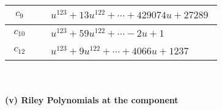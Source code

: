 \documentclass[1p]{elsarticle_modified}
\theoremstyle{definition}
\begin{document}
\begin{tabular}{m{50pt}|m{274pt}}
\hline $$\begin{aligned}c_{9}\end{aligned}$$&$\begin{aligned}
&u^{123}+13 u^{122}+\cdots+429074 u+27289
\end{aligned}$\\
\hline $$\begin{aligned}c_{10}\end{aligned}$$&$\begin{aligned}
&u^{123}+59 u^{122}+\cdots-2 u+1
\end{aligned}$\\
\hline $$\begin{aligned}c_{12}\end{aligned}$$&$\begin{aligned}
&u^{123}+9 u^{122}+\cdots+4066 u+1237
\end{aligned}$\\
\hline
\end{tabular}\\~\\
\newpage\renewcommand{\arraystretch}{1}
\flushleft \textbf{(v) Riley Polynomials at the component}\newline \\
\end{document}
